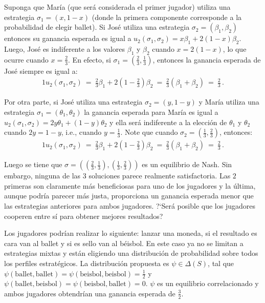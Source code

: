 Suponga que María (que será considerada el primer jugador) utiliza una estrategia $\sigma_1 = (x, 1-x)$ (donde la primera componente corresponde a la probabilidad de elegir ballet). Si José utiliza una estrategia $\sigma_2 = (\beta_1, \beta_2)$ entonces su ganancia esperada es igual a $u_2(\sigma_1, \sigma_2) = x\beta_1 + 2(1-x)\beta_2$. Luego, José es indiferente a los valores $\beta_1$ y $\beta_2$ cuando $x = 2(1-x)$, lo que ocurre cuando $x = \frac{2}{3}$. En efecto, si $\sigma_1 = \left(\frac{2}{3}, \frac{1}{3} \right)$, entonces la ganancia esperada de José siempre es igual a:
\begin{alignat}{1}
u_2(\sigma_1, \sigma_2)\ =\ \frac{2}{3}\beta_1 + 2\left(1-\frac{2}{3} \right)\beta_2\ =\ \frac{2}{3}(\beta_1 + \beta_2)\ =\ \frac{2}{3} \,.
\end{alignat}

Por otra parte, si José utiliza una estrategia $\sigma_2 = (y, 1-y)$ y María utiliza una estrategia $\sigma_1 = (\theta_1, \theta_2)$ la ganancia esperada para María es igual a $u_2(\sigma_1, \sigma_2) = 2y\theta_1 + (1-y)\theta_2$ y ella será indiferente a la elección de $\theta_1$ y $\theta_2$ cuando $2y = 1-y$, i.e., cuando $y = \frac{1}{3}$. Note que cuando $\sigma_2 = \left(\frac{1}{3}, \frac{2}{3} \right)$, entonces:
\begin{alignat}{1}
u_2(\sigma_1, \sigma_2)\ =\ \frac{2}{3}\beta_1 + 2\left(1-\frac{2}{3} \right)\beta_2\ =\ \frac{2}{3}(\beta_1 + \beta_2)\ =\ \frac{2}{3} \,.
\end{alignat}

Luego se tiene que $\sigma = \left(\left(\frac{2}{3}, \frac{1}{3}\right), \left(\frac{1}{3}, \frac{2}{3}\right)\right)$ es un equilibrio de Nash. Sin embargo, ninguna de las $3$ soluciones parece realmente satisfactoria. Las $2$ primeras son claramente más beneficiosas para uno de los jugadores y la última, aunque podría parecer más justa, proporciona un ganancia esperada menor que las estrategias anteriores para ambos jugadores. ?`Será posible que los jugadores cooperen entre sí para obtener mejores resultados?

Los jugadores podrían realizar lo siguiente: lanzar una moneda, si el resultado es cara van al ballet y si es sello van al béisbol. En este caso ya no se limitan a estrategias mixtas y están eligiendo una distribución de probabilidad sobre todos los perfiles estratégicos. La distribución propuesta es $\psi \in \Delta(S)$, tal que $\psi(\text{ballet}, \text{ballet}) = \psi(\text{beisbol}, \text{beisbol}) = \frac{1}{2}$ y $\psi(\text{ballet}, \text{beisbol}) = \psi(\text{beisbol}, \text{ballet}) =0$. $\psi$ es un equilibrio correlacionado y ambos jugadores obtendrían una ganancia esperada de $\frac{3}{2}$.